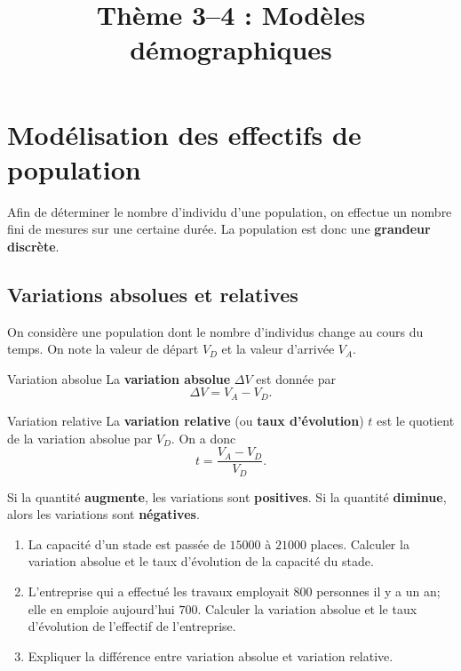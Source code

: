 \documentclass[11pt]{article}
\title{Thème 3--4 : Modèles démographiques}
\date{}
\author{}
\begin{document}
\maketitle\thispagestyle{fancy}

\section{Modélisation des effectifs de population}

Afin de déterminer le nombre d'individu d'une population, on effectue un nombre
fini de mesures sur une certaine durée. La population est donc une
\textbf{grandeur discrète}.

\subsection{Variations absolues et relatives}

On considère une population dont le nombre d'individus change au cours du
temps. On note la valeur de départ $V_D$ et la valeur d'arrivée $V_A$.

\begin{defi}{Variation absolue}
  La \textbf{variation absolue} $\Delta V$ est donnée par
  \[
    \Delta V = V_A - V_D.
  \]
\end{defi}

\begin{defi}{Variation relative}
  La \textbf{variation relative} (ou \textbf{taux d'évolution}) $t$ est le
  quotient de la variation absolue par $V_D$. On a donc
  \[
    t = \frac{V_A-V_D}{V_D}.
  \]
\end{defi}

\begin{rmq}
  Si la quantité \textbf{augmente}, les variations sont \textbf{positives}. Si
  la quantité \textbf{diminue}, alors les variations sont \textbf{négatives}.
\end{rmq}

\begin{app}
  \begin{enumerate}
    \item La capacité d'un stade est passée de $15000$ à $21000$ places.
      Calculer la variation absolue et le taux d'évolution de la capacité du
      stade.
    \item L'entreprise qui a effectué les travaux employait $800$ personnes il y
      a un an; elle en emploie aujourd'hui $700$. Calculer la variation absolue
      et le taux d'évolution de l'effectif de l'entreprise.
    \item Expliquer la différence entre variation absolue et variation relative.
  \end{enumerate}
\end{app}
\end{document}

